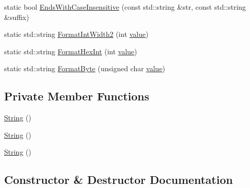 \begin{DoxyCompactItemize}
\item 
static bool \mbox{\hyperlink{classtesting_1_1internal_1_1_string_a3de1df085eddc89ef3f3833c67aee3fe}{Ends\+With\+Case\+Insensitive}} (const std\+::string \&str, const std\+::string \&suffix)
\item 
static std\+::string \mbox{\hyperlink{classtesting_1_1internal_1_1_string_a51cab855f7ec6091e5886b6be5598ca2}{Format\+Int\+Width2}} (int \mbox{\hyperlink{_obj__test_2lib_2googletest-master_2googlemock_2test_2gmock-matchers__test_8cc_a337b8a670efc0b086ad3af163f3121b6}{value}})
\item 
static std\+::string \mbox{\hyperlink{classtesting_1_1internal_1_1_string_a7bedf4780e0c938d203b73ddb17ff490}{Format\+Hex\+Int}} (int \mbox{\hyperlink{_obj__test_2lib_2googletest-master_2googlemock_2test_2gmock-matchers__test_8cc_a337b8a670efc0b086ad3af163f3121b6}{value}})
\item 
static std\+::string \mbox{\hyperlink{classtesting_1_1internal_1_1_string_ab3555eeb6abe4b7c6f63d865af10379d}{Format\+Byte}} (unsigned char \mbox{\hyperlink{_obj__test_2lib_2googletest-master_2googlemock_2test_2gmock-matchers__test_8cc_a337b8a670efc0b086ad3af163f3121b6}{value}})
\end{DoxyCompactItemize}
\subsection*{Private Member Functions}
\begin{DoxyCompactItemize}
\item 
\mbox{\hyperlink{classtesting_1_1internal_1_1_string_a7c370de44fce74608d0b7e3dd29de035}{String}} ()
\item 
\mbox{\hyperlink{classtesting_1_1internal_1_1_string_a7c370de44fce74608d0b7e3dd29de035}{String}} ()
\item 
\mbox{\hyperlink{classtesting_1_1internal_1_1_string_a7c370de44fce74608d0b7e3dd29de035}{String}} ()
\end{DoxyCompactItemize}


\subsection{Constructor \& Destructor Documentation}
\mbox{\label{classtesting_1_1internal_1_1_string_a7c370de44fce74608d0b7e3dd29de035}} 
